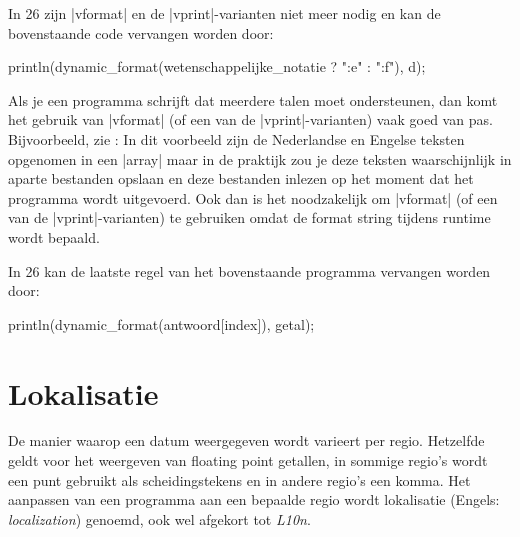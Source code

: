 \begin{cpplstShortInline}
In \Cpp{}26 zijn |vformat| en de |vprint|-varianten niet meer nodig en kan de bovenstaande code vervangen worden door:
\begin{cpplstfragment}
    println(dynamic_format(wetenschappelijke_notatie ? "{:e}" : "{:f}"), d);
\end{cpplstfragment}

Als je een programma schrijft dat meerdere talen moet ondersteunen, dan komt het gebruik van |vformat| (of een van de |vprint|-varianten) vaak goed van pas.
Bijvoorbeeld, zie :
\label{getal_number.cpp}
In dit voorbeeld zijn de Nederlandse en Engelse teksten opgenomen in een |array| maar in de praktijk zou je deze teksten waarschijnlijk in aparte bestanden opslaan en deze bestanden inlezen op het moment dat het programma wordt uitgevoerd.
Ook dan is het noodzakelijk om |vformat| (of een van de |vprint|-varianten) te gebruiken omdat de format string tijdens runtime wordt bepaald.

In \Cpp{}26 kan de laatste regel van het bovenstaande programma vervangen worden door:
\begin{cpplstfragment}
    println(dynamic_format(antwoord[index]), getal);
\end{cpplstfragment}

\section{Lokalisatie}
\label{sec:localization}
De manier waarop een datum weergegeven wordt varieert per regio.
Hetzelfde geldt voor het weergeven van floating point getallen, in sommige regio's wordt een punt gebruikt als scheidingstekens en in andere regio's een komma.
Het aanpassen van een programma aan een bepaalde regio wordt lokalisatie (Engels: \emph{localization}) genoemd, ook wel afgekort tot \emph{L10n}.


\end{cpplstShortInline}
